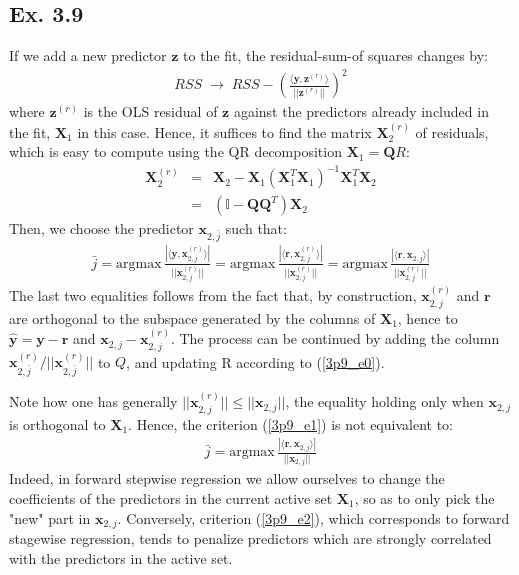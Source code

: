 \subsection*{Ex. 3.9}
If we add a new predictor $\mathbf{z}$ to the fit, the residual-sum-of squares changes by:
\begin{eqnarray*}
RSS \; \longrightarrow \; RSS - \left( \frac{ \langle \mathbf{y}, \mathbf{z}^{(r)} \rangle}{||\mathbf{z}^{(r)} ||} \right) ^2
\end{eqnarray*}
where $ \mathbf{z}^{(r)}$ is the OLS residual of $ \mathbf{z}$ against the predictors already included in the fit, $\mathbf{X}_1$ in this case. Hence, it suffices to find the matrix $\mathbf{X}_{2}^{(r)}$ of residuals,
which is easy to compute using the QR decomposition $\mathbf{X}_1 =  \mathbf{Q}R$:
\begin{eqnarray} \label{3p9_e0}
\mathbf{X}_{2}^{(r)} & = & \mathbf{X}_2 - \mathbf{X}_1 \left( \mathbf{X}_1^T \mathbf{X}_1 \right)^{-1} \mathbf{X}_1^T \mathbf{X}_2 \\
& = & \left( \mathbb{I} - \mathbf{Q} \mathbf{Q}^T \right) \mathbf{X}_2
\end{eqnarray}
Then, we choose the predictor $\mathbf{x}_{2, \bar{j}}$ such that:
\begin{eqnarray} \label{3p9_e1}
\bar{j} = \textrm{argmax}\, \frac{| \langle \mathbf{y}, \mathbf{x}_{2, j}^{(r)} \rangle |}{||\mathbf{x}_{2, j}^{(r)}||} = \textrm{argmax}\, \frac{| \langle \mathbf{r}, \mathbf{x}_{2, j}^{(r)} \rangle |}{||\mathbf{x}_{2, j}^{(r)}||} = \textrm{argmax}\, \frac{| \langle \mathbf{r}, \mathbf{x}_{2, j} \rangle |}{||\mathbf{x}_{2, j}^{(r)}||}
\end{eqnarray}
The last two equalities follows from the fact that, by construction, $\mathbf{x}_{2, j}^{(r)}$ and $\mathbf{r}$ are orthogonal to the subspace generated by the columns of $\mathbf{X}_1$, hence to $\hat{\mathbf{y}} = \mathbf{y} - \mathbf{r}$ and $\mathbf{x}_{2, j} - \mathbf{x}_{2, j}^{(r)}$. The
process can be continued by adding the column $\mathbf{x}_{2, \bar{j}}^{(r)} / ||\mathbf{x}_{2, \bar{j}}^{(r)}||$ to $Q$, and updating R according to (\ref{3p9_e0}).

Note how one has generally $||\mathbf{x}_{2, j}^{(r)}|| \leq ||\mathbf{x}_{2, j}||$, the equality holding 
only when $\mathbf{x}_{2, j}$ is orthogonal to $\mathbf{X}_1$. Hence, the criterion (\ref{3p9_e1}) is not equivalent to:
\begin{eqnarray} \label{3p9_e2}
\bar{j} = \textrm{argmax}\, \frac{| \langle \mathbf{r}, \mathbf{x}_{2, j} \rangle |}{||\mathbf{x}_{2, j}||}
\end{eqnarray}
Indeed, in forward stepwise regression we allow ourselves to change the coefficients of the predictors in the
current active set $ \mathbf{X}_1$, so as to only pick the "new" part in $\mathbf{x}_{2, j}$. Conversely, criterion (\ref{3p9_e2}), which corresponds to forward stagewise regression, tends to penalize predictors
which are strongly correlated with the predictors in the active set.

